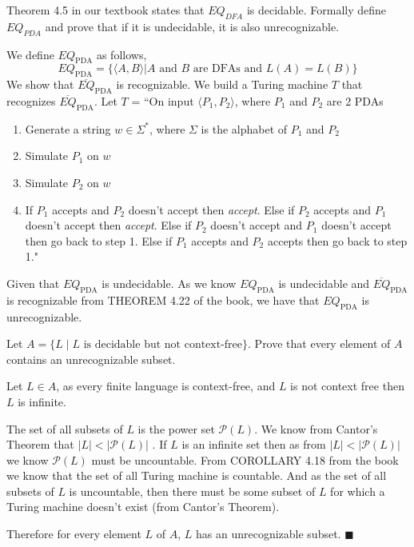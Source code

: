 \documentclass[addpoints]{exam}
\begin{document}
\begin{questions}
\question [10] Theorem 4.5 in our textbook states that $EQ_{DFA}$ is decidable. Formally define $EQ_{PDA}$ and prove that if it is undecidable, it is also unrecognizable. 
\begin{solution}
  	We define $EQ_{\mbox{PDA}}$ as follows,
	\[
		EQ_{\mbox{PDA}} = \{\langle A,B\rangle|A\mbox{ and } B \mbox{ are DFAs and }L(A)=L(B)\}
	\]
	We show that $\overline{EQ}_{\mbox{PDA}} $ is recognizable. We build a Turing machine $T$ that recognizes $\overline{EQ}_{\mbox{PDA}}$. Let $T$ = ``On input $\langle P_1, P_2\rangle$, where $P_1$ and $P_2$ are 2 PDAs
    \begin{enumerate}
      	\item Generate a string $w \in \Sigma^*$, where $\Sigma$ is the alphabet of $P_1$ and $P_2$
		\item Simulate $P_1$ on $w$
		\item Simulate $P_2$ on $w$
		\item If $P_1$ accepts and $P_2$ doesn't accept then \textit{accept}. Else if $P_2$ accepts and $P_1$ doesn't accept then \textit{accept}. Else if $P_2$ doesn't accept and $P_1$ doesn't accept then go back to step 1. Else if $P_1$ accepts and $P_2$ accepts then go back to step 1."
    \end{enumerate}
    Given that $EQ_{\mbox{PDA}}$  is undecidable. As we know $EQ_{\mbox{PDA}}$ is undecidable and $\overline{EQ}_{\mbox{PDA}}$ is recognizable from THEOREM 4.22 of the book, we have that $EQ_{\mbox{PDA}}$ is unrecognizable.
\end{solution}

\question [10] Let $A = \{L \mid L\text{ is decidable but not context-free}\}$. Prove that every element of $A$ contains an unrecognizable subset.
\begin{solution}
	Let $L\in A$, as every finite language is context-free, and $L$ is not context free then $L$ is infinite.

	The set of all subsets of $L$ is the power set $\mathcal{P}(L)$. We know from Cantor's Theorem that $|L| < |\mathcal{P}(L)|$ . If $L$ is an infinite set then as from  $|L| < |\mathcal{P}(L)|$ we know $\mathcal{P}(L)$ must be uncountable. From COROLLARY 4.18 from the book we know that the set of all Turing machine is countable. And as the set of all subsets of $L$ is uncountable, then there must be some subset of $L$ for which a Turing machine doesn't exist (from Cantor's Theorem).

	Therefore for every element $L$ of $A$, $L$ has an unrecognizable subset. \hfill $\blacksquare$
\end{solution}

\end{questions}
\end{document}
